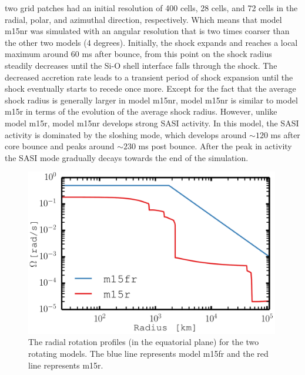 \begin{itemize}
two grid patches had an initial resolution of 400 cells, 28 cells, and 72 cells in the radial, polar, and
azimuthal direction, respectively. Which means that model m15nr was simulated with an angular resolution that is
two times coarser than the other two models (4 degrees). Initially, the shock expands and reaches a local maximum around $60$ ms after bounce,
from this point on the shock radius steadily decreases until the Si-O shell interface falls through the shock. The decreased accretion rate
leads to a transient period of shock expansion until the shock eventually starts to recede once more. Except for the fact that
the average shock radius is generally larger in model m15nr, model m15nr is similar to model m15r in terms of the evolution of the average shock
radius. However, unlike model m15r, model m15nr develops strong SASI activity. In this model, the SASI activity is dominated by the sloshing mode,
which develops around $\sim 120$ ms after core bounce and peaks around $\sim 230$ ms post bounce. After the peak in activity 
the SASI mode gradually decays towards the end of the simulation.   
\end{itemize}
\begin{figure}[ht]           
\centering                            
\includegraphics[width=0.99\textwidth]{./images/paper2/rot.pdf}
\caption{The radial rotation profiles (in the equatorial plane) for the two rotating models. The blue line represents model 
m15fr and the red line represents m15r. \label{figp2:rot}}
\end{figure}
